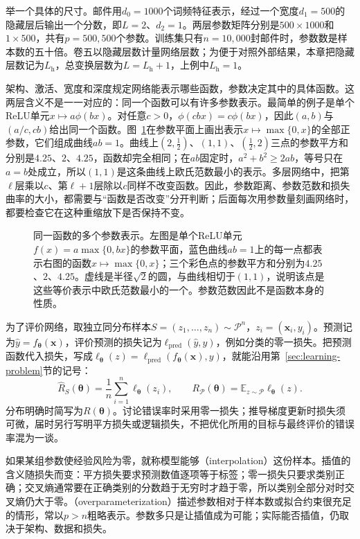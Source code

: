 举一个具体的尺寸。邮件用$d_0=1000$个词频特征表示，经过一个宽度$d_1=500$的隐藏层后输出一个分数，即$L=2$、$d_2=1$。两层参数矩阵分别是$500\times1000$和$1\times500$，共有$p=500{,}500$个参数。训练集只有$n=10{,}000$封邮件时，参数数是样本数的五十倍。卷五以隐藏层数计量网络层数；为便于对照外部结果，本章把隐藏层数记为$L_{\mathrm h}$，总变换层数为$L=L_{\mathrm h}+1$，上例中$L_{\mathrm h}=1$。

架构、激活、宽度和深度规定网络能表示哪些函数，参数决定其中的具体函数。这两层含义不是一一对应的：同一个函数可以有许多参数表示。最简单的例子是单个ReLU单元$x\mapsto a\phi(bx)$。对任意$c>0$，$\phi(cbx)=c\phi(bx)$，因此$(a,b)$与$(a/c,cb)$给出同一个函数。图~\ref{fig:lt8-relu-rescaling}在参数平面上画出表示$x\mapsto\max\{0,x\}$的全部正参数，它们组成曲线$ab=1$。曲线上$(2,\tfrac12)$、$(1,1)$、$(\tfrac12,2)$三点的参数平方和分别是$4.25$、$2$、$4.25$，函数却完全相同；在$ab$固定时，$a^2+b^2\geq2ab$，等号只在$a=b$处成立，所以$(1,1)$是这条曲线上欧氏范数最小的表示。多层网络中，把第$\ell$层乘以$c$、第$\ell+1$层除以$c$同样不改变函数。因此，参数距离、参数范数和损失曲率的大小，都需要与“函数是否改变”分开判断；后面每次用参数量刻画网络时，都要检查它在这种重缩放下是否保持不变。

\begin{figure}[htbp]
  \centering
  
  \caption{同一函数的多个参数表示。左图是单个ReLU单元$f(x)=a\max\{0,bx\}$的参数平面，蓝色曲线$ab=1$上的每一点都表示右图的函数$x\mapsto\max\{0,x\}$；三个彩色点的参数平方和分别为$4.25$、$2$、$4.25$。虚线是半径$\sqrt2$的圆，与曲线相切于$(1,1)$，说明该点是这些等价表示中欧氏范数最小的一个。参数范数因此不是函数本身的性质。}
  \label{fig:lt8-relu-rescaling}
\end{figure}

为了评价网络，取独立同分布样本$S=(z_1,\ldots,z_n)\sim\mathcal P^n$，$z_i=(\bm x_i,y_i)$。预测记为$\widehat y=f_{\bm\theta}(\bm x)$，评价预测的损失记为$\ell_{\mathrm{pred}}(\widehat y,y)$，例如分类的零一损失。把预测函数代入损失，写成$\ell_{\bm\theta}(z)=\ell_{\mathrm{pred}}(f_{\bm\theta}(\bm x),y)$，就能沿用第~\ref{sec:learning-problem}节的记号：
\[
 \hat R_S(\bm\theta)=\frac1n\sum_{i=1}^n\ell_{\bm\theta}(z_i),
 \qquad
 R_{\mathcal P}(\bm\theta)=\mathbb E_{z\sim\mathcal P}\ell_{\bm\theta}(z).
\]
分布明确时简写为$R(\bm\theta)$。讨论错误率时采用零一损失；推导梯度更新时损失须可微，届时另行写明平方损失或逻辑损失，不把优化所用的目标与最终评价的错误率混为一谈。

如果某组参数使经验风险为零，就称模型能够（interpolation）这份样本。插值的含义随损失而变：平方损失要求预测数值逐项等于标签；零一损失只要求类别正确；交叉熵通常要在正确类别的分数趋于无穷时才趋于零，所以类别全部分对时交叉熵仍大于零。（overparameterization）描述参数相对于样本数或拟合约束很充足的情形，常以$p>n$粗略表示。参数多只是让插值成为可能；实际能否插值，仍取决于架构、数据和损失。

